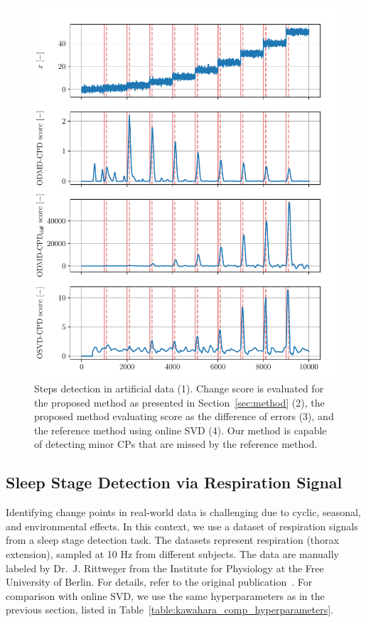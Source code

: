 \begin{figure}[H]
	\centering
	\includegraphics[width=\linewidth]{figures/y0-chd_r2_100_100-roll_301-dmd_w1.0-h80.pdf}
	\caption{Steps detection in artificial data (1). Change score is evaluated for the proposed method as presented in Section~\ref{sec:method} (2), the proposed method evaluating score as the difference of errors (3), and the reference method using online SVD (4). Our method is capable of detecting minor CPs that are missed by the reference method.}\label{fig:artificial_steps_detection}
\end{figure}

\subsection{Sleep Stage Detection via Respiration Signal}
Identifying change points in real-world data is challenging due to cyclic, seasonal, and environmental effects. In this context, we use a dataset of respiration signals from a sleep stage detection task. The datasets represent respiration (thorax extension), sampled at 10 Hz from different subjects. The data are manually labeled by Dr.~J. Rittweger from the Institute for Physiology at the Free University of Berlin. For details, refer to the original publication~\citep{Keogh2005}. For comparison with online SVD, we use the same hyperparameters as in the previous section, listed in Table~\ref{table:kawahara_comp_hyperparameters}.

